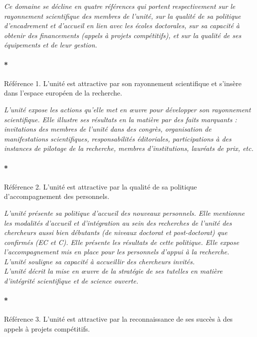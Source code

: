 \documentclass[]{article}
\let\oldparagraph\paragraph
\renewcommand{\paragraph}[1]{\oldparagraph{#1}\mbox{}}
\newcommand{\instructions}[1]{{\em \color{hceresgreen}#1}}
\begin{document}
\instructions{Ce domaine se décline en quatre références qui portent respectivement sur le rayonnement scientifique des membres de l’unité, sur la qualité de sa politique d’encadrement et d’accueil en lien avec les écoles doctorales, sur sa capacité à obtenir des financements (appels à projets compétitifs), et sur la qualité de ses équipements et de leur gestion.}

\paragraph*{Référence 1. L'unité est attractive par son rayonnement
scientifique et s'insère dans l'espace européen de la recherche.}

\instructions{L’unité expose les actions qu’elle met en œuvre pour développer son rayonnement scientifique. Elle illustre ses résultats en la matière par des faits marquants : invitations des membres de l’unité dans des congrès, organisation de manifestations scientifiques, responsabilités éditoriales, participations à des instances de pilotage de la recherche, membres d’institutions, lauréats de prix, etc.}

\paragraph*{Référence 2. L'unité est attractive par la qualité de sa
politique d'accompagnement des personnels.}

\instructions{L’unité présente sa politique d’accueil des nouveaux personnels. Elle mentionne les modalités d’accueil et d’intégration au sein des recherches de l’unité des chercheurs aussi bien débutants (de niveaux doctorat et post-doctorat) que confirmés (EC et C). Elle présente les résultats de cette politique. Elle expose l’accompagnement mis en place pour les personnels d’appui à la recherche.\\

L’unité souligne sa capacité à accueillir des chercheurs invités.\\

L’unité décrit la mise en œuvre de la stratégie de ses tutelles en matière d’intégrité scientifique et de science ouverte.}

\paragraph*{Référence 3. L'unité est attractive par la reconnaissance de
ses succès à des appels à projets compétitifs.}
\end{document}
